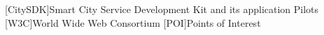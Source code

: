 [CitySDK]{Smart City Service Development Kit and its application Pilots}
[W3C]{World Wide Web Consortium}
[POI]{Points of Interest}